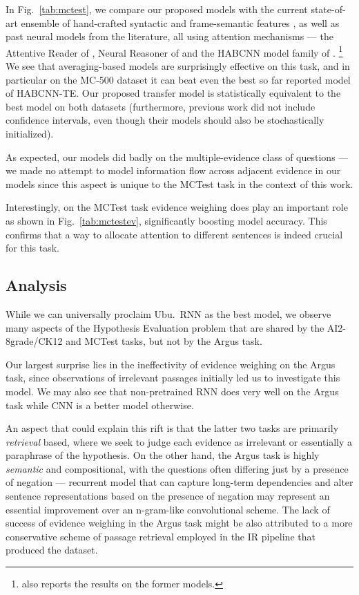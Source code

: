 \documentclass[11pt]{article}
\begin{document}
In Fig.~\ref{tab:mctest}, we compare our proposed models with the current state-of-art
ensemble of hand-crafted syntactic and frame-semantic features \cite{MCWang},
as well as past neural models
from the literature, all using attention mechanisms --- the Attentive Reader of \cite{ReadComprehend},
Neural Reasoner of \cite{NeuralReasoner} and the HABCNN model family of \cite{HABCNN}.%
\footnote{\cite{HABCNN} also reports the results on the former models.}
We see that averaging-based models are surprisingly effective on this task,
and in particular on the MC-500 dataset it can beat even the best so far reported model of HABCNN-TE.\@
Our proposed transfer model is statistically equivalent to the best model on both datasets
(furthermore, previous work did not include
confidence intervals, even though their models should also be stochastically initialized).

As expected, our models did badly on the multiple-evidence class of questions
--- we made no attempt to model information flow across adjacent evidence in our
models since this aspect is unique to the MCTest task in the
context of this work.


Interestingly, on the MCTest task evidence weighing does play an important role
as shown in Fig.~\ref{tab:mctestev},
significantly boosting model accuracy.
This confirms that a way to allocate attention to different sentences
is indeed crucial for this task.

\subsection{Analysis}

While we can universally proclaim Ubu.\ RNN as the best model,
we observe many aspects of the Hypothesis Evaluation problem that are shared
by the AI2-8grade/CK12 and MCTest tasks, but not by the Argus task.

Our largest surprise lies in the ineffectivity of evidence weighing
on the Argus task, since observations of irrelevant passages initially
led us to investigate this model.  %
We may also see that non-pretrained RNN does very well on the Argus task
while CNN is a better model otherwise.

An aspect that could explain this rift is that the latter two tasks
are primarily \textit{retrieval} based, where we seek to judge each
evidence as irrelevant or essentially a paraphrase of the hypothesis.
On the other hand, the Argus task is highly \textit{semantic}
and compositional, with the questions often differing just by a presence
of negation --- recurrent model that can capture long-term dependencies
and alter sentence representations based on the presence of negation
may represent an essential improvement over an n-gram-like convolutional
scheme.
The lack of success of evidence weighing in the Argus task might be also
attributed to a more conservative scheme of passage retrieval employed
in the IR pipeline that produced the dataset.
\end{document}
